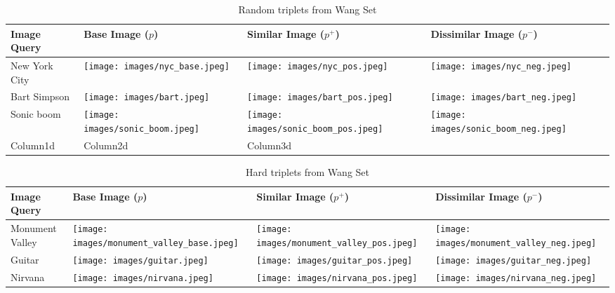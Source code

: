 \begin{table}
	\begin{tabular}{>{\centering\arraybackslash}m{1in} >{\centering\arraybackslash}m{1.4in} >{\centering\arraybackslash}m{1.4in} >{\centering\arraybackslash}m{1.4in}}
		\toprule
		\bfseries Image Query & \bfseries Base Image ($p$) & \bfseries Similar Image ($p^+$) & \bfseries Dissimilar Image ($p^-$) \\
		\midrule
		\centering New York City & \texttt{[image: images/nyc\_base.jpeg]} & \texttt{[image: images/nyc\_pos.jpeg]} & \texttt{[image: images/nyc\_neg.jpeg]}\\
		Bart Simpson & \texttt{[image: images/bart.jpeg]} & \texttt{[image: images/bart\_pos.jpeg]} & \texttt{[image: images/bart\_neg.jpeg]}\\
		Sonic boom & \texttt{[image: images/sonic\_boom.jpeg]} & \texttt{[image: images/sonic\_boom\_pos.jpeg]} & \texttt{[image: images/sonic\_boom\_neg.jpeg]}\\
		Column1d & Column2d & Column3d & \\
		\bottomrule
	\end{tabular}
	\caption{Random triplets from Wang Set}
	\label{table:random_triplets}
\end{table}

\begin{table}
	\begin{tabular}{>{\centering\arraybackslash}m{1in} >{\centering\arraybackslash}m{1.4in} >{\centering\arraybackslash}m{1.4in} >{\centering\arraybackslash}m{1.4in}}
		\toprule
		\bfseries Image Query & \bfseries Base Image ($p$) & \bfseries Similar Image ($p^+$) & \bfseries Dissimilar Image ($p^-$) \\
		\midrule
		\centering Monument Valley & \texttt{[image: images/monument\_valley\_base.jpeg]} & \texttt{[image: images/monument\_valley\_pos.jpeg]} & \texttt{[image: images/monument\_valley\_neg.jpeg]}\\
		Guitar & \texttt{[image: images/guitar.jpeg]} & \texttt{[image: images/guitar\_pos.jpeg]} & \texttt{[image: images/guitar\_neg.jpeg]}\\
		Nirvana & \texttt{[image: images/nirvana.jpeg]} & \texttt{[image: images/nirvana\_pos.jpeg]} & \texttt{[image: images/nirvana\_neg.jpeg]}\\
		\bottomrule
	\end{tabular}
	\caption{Hard triplets from Wang Set}
	\label{table:hard_triplets}
\end{table}

